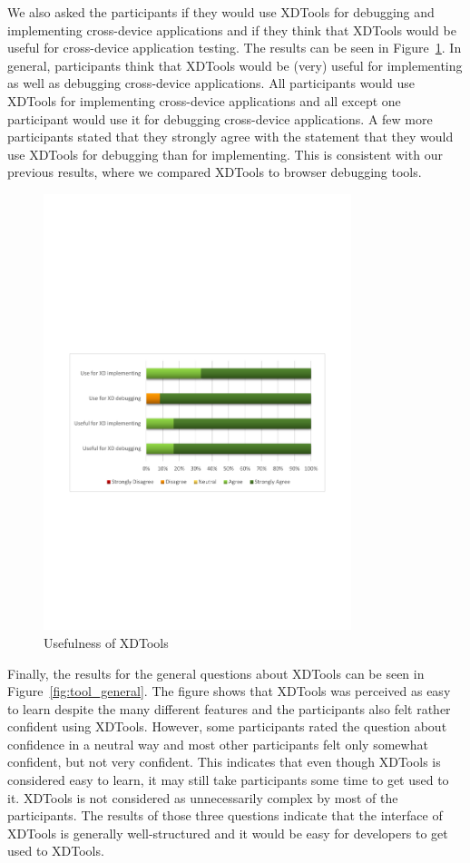 We also asked the participants if they would use XDTools for debugging and implementing cross-device applications and if they think that XDTools would be useful for cross-device application testing. The results can be seen in Figure~\ref{fig:usefulness_tool}. In general, participants think that XDTools would be (very) useful for implementing as well as debugging cross-device applications. All participants would use XDTools for implementing cross-device applications and all except one participant would use it for debugging cross-device applications. A few more participants stated that they strongly agree with the statement that they would use XDTools for debugging than for implementing. This is consistent with our previous results, where we compared XDTools to browser debugging tools.

\begin{figure}[H]
  \centering
    \includegraphics[width=0.8\textwidth]{images/charts/usefulness_tool.pdf}
	\caption[Usefulness]{Usefulness of XDTools}
	\label{fig:usefulness_tool}
\end{figure}

Finally, the results for the general questions about XDTools can be seen in Figure~\ref{fig:tool_general}. The figure shows that XDTools was perceived as easy to learn despite the many different features and the participants also felt rather confident using XDTools. However, some participants rated the question about confidence in a neutral way and most other participants felt only somewhat confident, but not very confident. This indicates that even though XDTools is considered easy to learn, it may still take participants some time to get used to it. XDTools is not considered as unnecessarily complex by most of the participants. The results of those three questions indicate that the interface of XDTools is generally well-structured and it would be easy for developers to get used to XDTools.

